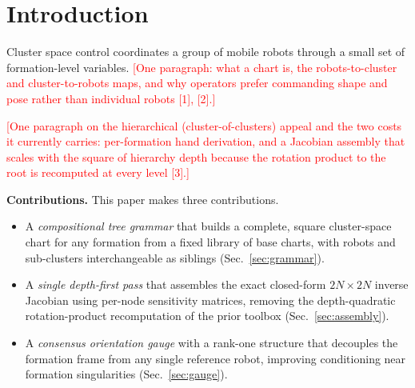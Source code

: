 \documentclass[conference]{IEEEtran}
\newcommand{\fillnote}[1]{\textcolor{red}{[#1]}} %
\begin{document}
\section{Introduction}

Cluster space control coordinates a group of mobile robots through a small set
of formation-level variables. \fillnote{One paragraph: what a chart is, the
robots-to-cluster and cluster-to-robots maps, and why operators prefer commanding
shape and pose rather than individual robots [1], [2].}

\fillnote{One paragraph on the hierarchical (cluster-of-clusters) appeal and the
two costs it currently carries: per-formation hand derivation, and a Jacobian
assembly that scales with the square of hierarchy depth because the rotation
product to the root is recomputed at every level [3].}

\textbf{Contributions.} This paper makes three contributions.
\begin{itemize}
\item A \emph{compositional tree grammar} that builds a complete, square
cluster-space chart for any formation from a fixed library of base charts, with
robots and sub-clusters interchangeable as siblings (Sec.~\ref{sec:grammar}).
\item A \emph{single depth-first pass} that assembles the exact closed-form
$2N \times 2N$ inverse Jacobian using per-node sensitivity matrices, removing the
depth-quadratic rotation-product recomputation of the prior toolbox
(Sec.~\ref{sec:assembly}).
\item A \emph{consensus orientation gauge} with a rank-one structure that
decouples the formation frame from any single reference robot, improving
conditioning near formation singularities (Sec.~\ref{sec:gauge}).
\end{itemize}
\end{document}
